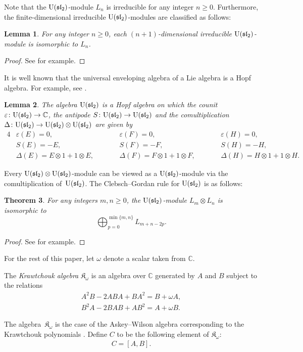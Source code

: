 \documentclass[10pt,a4paper]{amsart}
\def\C{\mathbb C}
\def\K{\mathfrak K_\omega}
\def\U{{\rm U}(\mathfrak{sl}_2)}
\def\e{\varepsilon}
\numberwithin{equation}{section}
\newtheorem{Theorem}{Theorem}[section]
\newtheorem{Lemma}[Theorem]{Lemma}
\begin{document}
Note that the $\U$-module $L_n$ is irreducible for any integer $n\geq 0$. Furthermore, the finite-dimensional irreducible $\U$-modules are classified as follows:

\begin{Lemma}\label{lem:classification_Umodule}
For any integer $n\geq 0$, each $(n+1)$-dimensional irreducible $\U$-module is isomorphic to $L_n$.
\end{Lemma}

\begin{proof}
See \cite[Section V.4]{kassel} for example.
\end{proof}

It is well known that the universal enveloping algebra of a Lie algebra is a Hopf algebra. For example, see \cite[Section 5]{Hopf65}.

\begin{Lemma}\label{lem:Hopf_U}
The algebra $\U$ is a Hopf algebra on which the counit $\e\colon \U\to \C$, the antipode $S\colon \U\to \U$ and the comultiplication $\Delta\colon \U\to \U\otimes \U$ are given by
\begin{alignat*}{4}
&\e(E)=0,\qquad&&
\e(F) =0,\qquad&&
\e(H)=0,&
\\
&S(E)=-E,\qquad&&
S(F) =-F,\qquad&&
S(H)=-H,&
\\
&\Delta(E)=E\otimes 1+1\otimes E,
\qquad&&
\Delta(F)=F\otimes 1+1\otimes F,
\qquad&&
\Delta(H)=H\otimes 1+1\otimes H.&
\end{alignat*}
\end{Lemma}

Every $\U\otimes \U$-module can be viewed as a $\U$-module via the comultiplication of~$\U$.
The Clebsch--Gordan rule for $\U$ is as follows:

\begin{Theorem}\label{thm:CGrule_U}
For any integers $m,n\geq 0$, the $\U$-module $L_m\otimes L_n$ is isomorphic to
\[
\bigoplus_{p=0}^{\min\{m,n\}}L_{m+n-2p}.
\]
\end{Theorem}
\begin{proof}
See \cite[Section V.5]{kassel} for example.
\end{proof}

For the rest of this paper, let $\omega$ denote a scalar taken from $\C$.

\begin{Definition}\label{defn:K}
The {\it Krawtchouk algebra} $\K$ is an algebra over $\C$ generated by $A$ and $B$ subject to the relations
\begin{gather}
A^2 B-2 ABA +B A^2
=
B+\omega A,
\label{R1}
\\
B^2A-2 BAB+AB^2
=
A+\omega B.
\label{R2}
\end{gather}
\end{Definition}
The algebra~$\K$ is the case of the Askey--Wilson algebra corresponding to the Krawtchouk polynomials \cite[Lemma 7.2]{Vidunas:2007}.
Define $C$ to be the following element of $\K$:
\begin{gather*}
C=[A,B].
\end{gather*}
\end{document}

